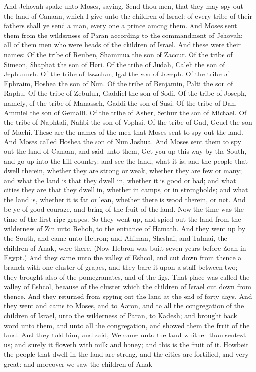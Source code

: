 And Jehovah spake unto Moses, saying, Send thou men, that they may spy out the land of Canaan, which I give unto the children of Israel: of every tribe of their fathers shall ye send a man, every one a prince among them. And Moses sent them from the wilderness of Paran according to the commandment of Jehovah: all of them men who were heads of the children of Israel. And these were their names: Of the tribe of Reuben, Shammua the son of Zaccur. Of the tribe of Simeon, Shaphat the son of Hori. Of the tribe of Judah, Caleb the son of Jephunneh. Of the tribe of Issachar, Igal the son of Joseph. Of the tribe of Ephraim, Hoshea the son of Nun. Of the tribe of Benjamin, Palti the son of Raphu. Of the tribe of Zebulun, Gaddiel the son of Sodi. Of the tribe of Joseph, namely, of the tribe of Manasseh, Gaddi the son of Susi. Of the tribe of Dan, Ammiel the son of Gemalli. Of the tribe of Asher, Sethur the son of Michael. Of the tribe of Naphtali, Nahbi the son of Vophsi. Of the tribe of Gad, Geuel the son of Machi. These are the names of the men that Moses sent to spy out the land. And Moses called Hoshea the son of Nun Joshua.  And Moses sent them to spy out the land of Canaan, and said unto them, Get you up this way by the South, and go up into the hill-country: and see the land, what it is; and the people that dwell therein, whether they are strong or weak, whether they are few or many; and what the land is that they dwell in, whether it is good or bad; and what cities they are that they dwell in, whether in camps, or in strongholds; and what the land is, whether it is fat or lean, whether there is wood therein, or not. And be ye of good courage, and bring of the fruit of the land. Now the time was the time of the first-ripe grapes.  So they went up, and spied out the land from the wilderness of Zin unto Rehob, to the entrance of Hamath. And they went up by the South, and came unto Hebron; and Ahiman, Sheshai, and Talmai, the children of Anak, were there. (Now Hebron was built seven years before Zoan in Egypt.) And they came unto the valley of Eshcol, and cut down from thence a branch with one cluster of grapes, and they bare it upon a staff between two; they brought also of the pomegranates, and of the figs. That place was called the valley of Eshcol, because of the cluster which the children of Israel cut down from thence.  And they returned from spying out the land at the end of forty days. And they went and came to Moses, and to Aaron, and to all the congregation of the children of Israel, unto the wilderness of Paran, to Kadesh; and brought back word unto them, and unto all the congregation, and showed them the fruit of the land. And they told him, and said, We came unto the land whither thou sentest us; and surely it floweth with milk and honey; and this is the fruit of it. Howbeit the people that dwell in the land are strong, and the cities are fortified, and very great: and moreover we saw the children of Anak 
